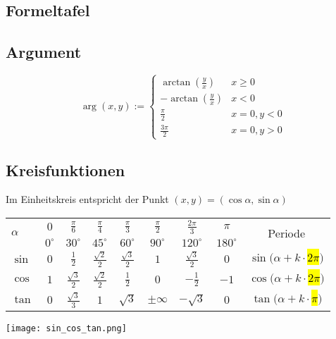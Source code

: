 \begin{multicols}{2}

\section{Formeltafel}

\subsection{Argument}
\[
	\arg(x,y) := \begin{cases}
		\arctan(\frac{y}{x}) & x \geq 0 \\
		-\arctan(\frac{y}{x}) & x < 0 \\
		\frac{\pi}{2} & x=0, y < 0 \\
		\frac{3\pi}{2} & x = 0, y > 0
	\end{cases}
\]

\subsection{Kreisfunktionen}
Im Einheitskreis entspricht der Punkt $(x,y) = (\cos \alpha, \sin \alpha)$
\begin{tabular}{|l||c|c|c|c|c|c|c||c|}\hline
\multirow{2}{*}{$\alpha$} & $0$ & $\frac{\pi}{6}$ & $\frac{\pi}{4}$ & $\frac{\pi}{3}$ & $\frac{\pi}{2}$ & $\frac{2\pi}{3}$ & $\pi$ & \multirow{2}{*}{Periode}\\
& $0^\circ$ & $30^\circ$ & $45^\circ$ & $60^\circ$ & $90^\circ$ & $120^\circ$ & $180^\circ$ &\\ \hline
$\sin$ & $0$ & $\frac{1}{2}$ & $\frac{\sqrt{2}}{2}$ & $\frac{\sqrt{3}}{2}$ & $1$ & $\frac{\sqrt{3}}{2}$ & $0$ & $\sin(\alpha + k\cdot$\hl{$2\pi$}$)$\\ \hline
$\cos$ & $1$ & $\frac{\sqrt{3}}{2}$ & $\frac{\sqrt{2}}{2}$ & $\frac{1}{2}$ & $0$ & $-\frac{1}{2}$ & $-1$ & $\cos(\alpha + k\cdot$\hl{$2\pi$}$)$ \\ \hline
$\tan$ & $0$ & $\frac{\sqrt{3}}{3}$ & $1$ & $\sqrt{3}$ & $\pm \infty$ &
$-\sqrt{3}$ & $0$ & $\tan(\alpha + k \cdot$\hl{$\pi$}$)$  \\ \hline
\end{tabular}
\texttt{[image: sin\_cos\_tan.png]}


\end{multicols}
